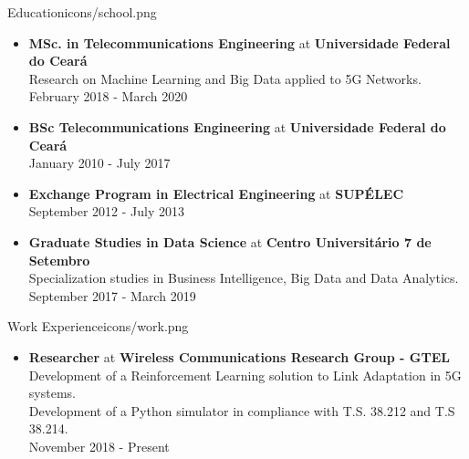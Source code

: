 \documentclass{thepurplecv}
\begin{document}
\begin{purplesectionleft}{Education}{icons/school.png}
{
\begin{itemize}[leftmargin=0cm,align=left]
    \item[] \textbf{MSc. in Telecommunications Engineering} at \textbf{Universidade Federal do Ceará}\\
    Research on Machine Learning and Big Data applied to 5G Networks. \\
    February 2018 - March 2020

    \item[] \textbf{BSc Telecommunications Engineering} at \textbf{Universidade Federal do Ceará}\\
    January 2010 - July 2017

    \item[] \textbf{Exchange Program in Electrical Engineering} at \textbf{SUPÉLEC}\\
    September 2012 - July 2013

    \item[] \textbf{Graduate Studies in Data Science} at \textbf{Centro Universitário 7 de Setembro}\\
    Specialization studies in Business Intelligence, Big Data and Data Analytics. \\
    September 2017 - March 2019
\end{itemize}
}
\end{purplesectionleft}

\begin{purplesectionright}{Work Experience}{icons/work.png}
{
\begin{itemize}[leftmargin=0cm,align=left]
    \item[] \textbf{Researcher} at \textbf{Wireless Communications Research Group - GTEL}\\
    Development of a Reinforcement Learning solution to Link Adaptation in 5G systems.\\
    Development of a Python simulator in compliance with T.S. 38.212 and T.S 38.214.\\
    November 2018 - Present \\
\end{itemize}
}
\end{purplesectionright}
\end{document}
